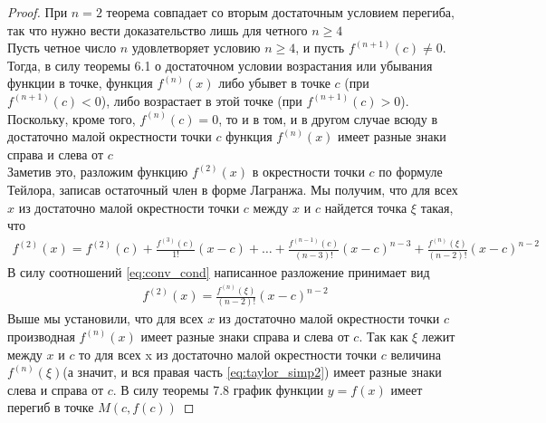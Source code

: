 \documentclass[10pt]{article}
\begin{document}
    \begin{proof}
        При $n=2$ теорема совпадает со вторым достаточным условием перегиба, так что нужно вести доказательство лишь для четного $n \geq 4$\\
        Пусть четное число $n$ удовлетворяет условию $n \geq 4$, и пусть $f^{(n+1)}(c) \neq 0$. Тогда, в силу теоремы 6.1 о достаточном условии возрастания или убывания функции в точке, функция $f^{(n)}(x)$ либо убывет в точке $c$ (при $f^{(n+1)}(c) < 0$), либо возрастает в этой точке (при $f^{(n+1)}(c) > 0$). Поскольку, кроме того, $f^{(n)}(c) = 0$, то и в том, и в другом случае всюду в достаточно малой окрестности точки $c$ функция $f^{(n)}(x)$ имеет разные знаки справа и слева от $c$\\
        Заметив это, разложим функцию $f^{(2)}(x)$ в окрестности точки $c$ по формуле Тейлора, записав остаточный член в форме Лагранжа. Мы получим, что для всех $x$ из достаточно малой окрестности точки $c$ между $x$ и $c$ найдется точка $\xi$ такая, что
        \begin{gather*}
            f^{(2)}(x) = f^{(2)}(c) + \frac{f^{(3)}(c)}{1!}(x-c) + \ldots + \frac{f^{(n-1)}(c)}{(n-3)!}(x-c)^{n-3} + \frac{f^{(n)}(\xi)}{(n-2)!}(x-c)^{n-2}
        \end{gather*}
        В силу соотношений \ref{eq:conv_cond} написанное разложение принимает вид
        \begin{gather}
            f^{(2)}(x) = \frac{f^{(n)}(\xi)}{(n-2)!}(x-c)^{n-2} \label{eq:taylor_simp2}
        \end{gather}
        Выше мы установили, что для всех $x$ из достаточно малой окрестности точки $c$ производная $f^{(n)}(x)$ имеет разные знаки справа и слева от $c$. Так как $\xi$ лежит между $x$ и $c$ то для всех x из достаточно малой окрестности точки $c$ величина $f^{(n)}(\xi)$(а значит, и вся правая часть \ref{eq:taylor_simp2}) имеет разные знаки слева и справа от $c$. В силу теоремы 7.8 график функции $y = f(x)$ имеет перегиб в точке $M(c, f(c))$
    \end{proof}
\end{document}
